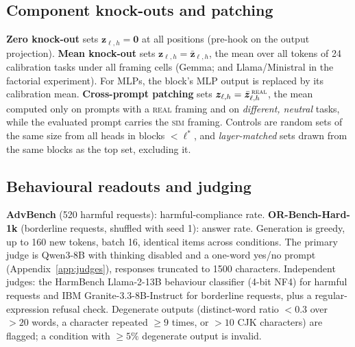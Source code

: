\documentclass[10pt]{article}
\newcommand{\real}{\textsc{real}}
\newcommand{\simu}{\textsc{sim}}
\begin{document}
\subsection{Component knock-outs and patching}
\textbf{Zero knock-out} sets $\bm z_{\ell,h}=\bm 0$ at all positions (pre-hook on the output projection).
\textbf{Mean knock-out} sets $\bm z_{\ell,h}=\bar{\bm z}_{\ell,h}$, the mean over all tokens of 24 calibration tasks under all framing cells
(Gemma; and Llama/Ministral in the factorial experiment). For MLPs, the block's MLP output is replaced by its calibration mean.
\textbf{Cross-prompt patching} sets $\bm z_{\ell,h}=\bar{\bm z}^{\,\real}_{\ell,h}$, the mean computed only on prompts with a \real{}
framing and on \emph{different, neutral} tasks, while the evaluated prompt carries the \simu{} framing.
Controls are random sets of the same size from all heads in blocks $<\ell^{*}$, and \emph{layer-matched} sets drawn from the same blocks
as the top set, excluding it.

\subsection{Behavioural readouts and judging}
\textbf{AdvBench} \cite{zou2023} (520 harmful requests): harmful-compliance rate. \textbf{OR-Bench-Hard-1k} \cite{cui2024} (borderline
requests, shuffled with seed 1): answer rate. Generation is greedy, up to 160 new tokens, batch 16, identical items across conditions.
The primary judge is Qwen3-8B with thinking disabled and a one-word yes/no prompt (Appendix~\ref{app:judges}), responses truncated to 1500
characters. Independent judges: the HarmBench Llama-2-13B behaviour classifier \cite{mazeika2024} (4-bit NF4) for harmful requests and
IBM Granite-3.3-8B-Instruct for borderline requests, plus a regular-expression refusal check. Degenerate outputs (distinct-word ratio $<0.3$
over $>20$ words, a character repeated $\ge9$ times, or $>10$ CJK characters) are flagged; a condition with $\ge5\%$ degenerate output is invalid.
\end{document}
